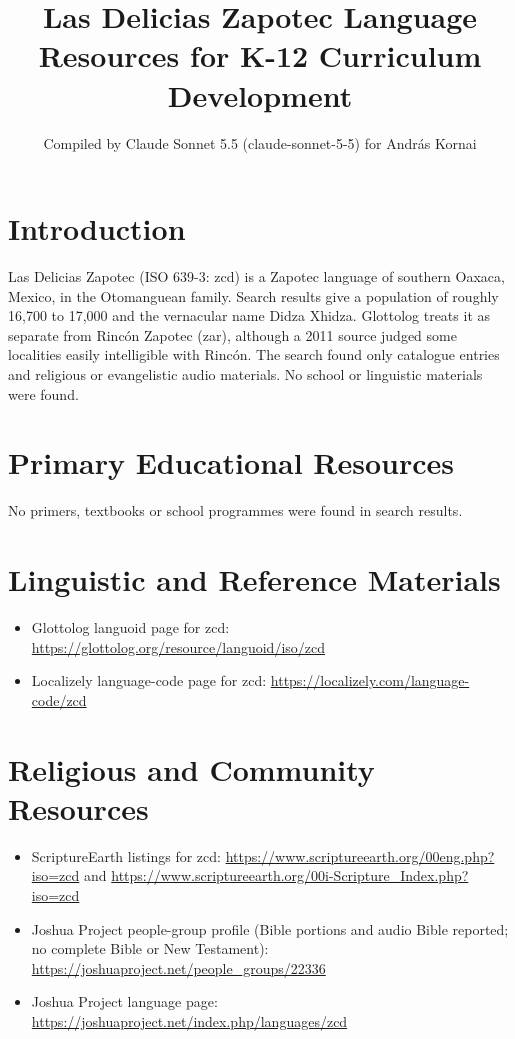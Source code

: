 \documentclass[12pt]{article}
\title{Las Delicias Zapotec Language Resources for K-12 Curriculum Development}
\author{Compiled by Claude Sonnet 5.5 (claude-sonnet-5-5) for Andr\'as Kornai}
\date{}
\begin{document}
\maketitle

\section{Introduction}
Las Delicias Zapotec (ISO 639-3: zcd) is a Zapotec language of southern Oaxaca, Mexico, in the Otomanguean family. Search results give a population of roughly 16,700 to 17,000 and the vernacular name Didza Xhidza. Glottolog treats it as separate from Rinc\'on Zapotec (zar), although a 2011 source judged some localities easily intelligible with Rinc\'on. The search found only catalogue entries and religious or evangelistic audio materials. No school or linguistic materials were found.

\section{Primary Educational Resources}
No primers, textbooks or school programmes were found in search results.

\section{Linguistic and Reference Materials}
\begin{itemize}
\item Glottolog languoid page for zcd: \url{https://glottolog.org/resource/languoid/iso/zcd}
\item Localizely language-code page for zcd: \url{https://localizely.com/language-code/zcd}
\end{itemize}

\section{Religious and Community Resources}
\begin{itemize}
\item ScriptureEarth listings for zcd: \url{https://www.scriptureearth.org/00eng.php?iso=zcd} and \url{https://www.scriptureearth.org/00i-Scripture_Index.php?iso=zcd}
\item Joshua Project people-group profile (Bible portions and audio Bible reported; no complete Bible or New Testament): \url{https://joshuaproject.net/people_groups/22336}
\item Joshua Project language page: \url{https://joshuaproject.net/index.php/languages/zcd}
\end{itemize}
\end{document}
